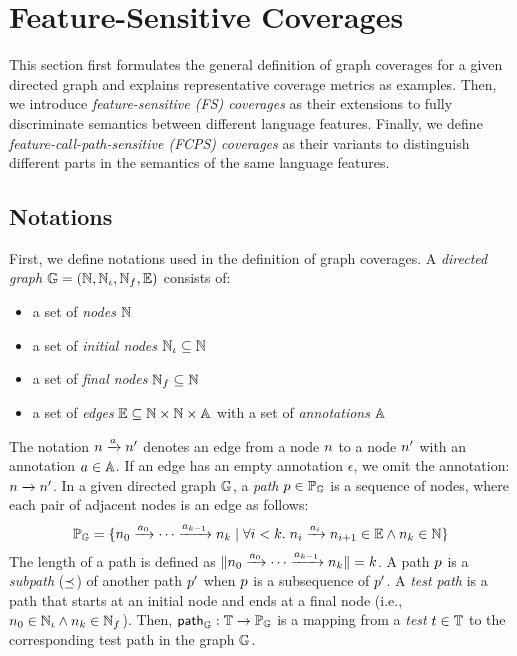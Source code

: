 \section{Feature-Sensitive Coverages}\label{sec:fscov}

This section first formulates the general definition of graph coverages for a
given directed graph and explains representative coverage metrics as examples.
%
Then, we introduce \textit{feature-sensitive (FS) coverages} as their
extensions to fully discriminate semantics between different language features.
%
Finally, we define \textit{feature-call-path-sensitive (FCPS) coverages} as
their variants to distinguish different parts in the semantics of the same
language features.




\subsection{Notations}
%
First, we define notations used in the definition of graph coverages.
%
A \textit{directed graph} $\mathbb{G} = (\mathbb{N}, \mathbb{N}_\iota,
\mathbb{N}_f, \mathbb{E})$ consists of:
\begin{itemize}
  \item a set of \textit{nodes} $\mathbb{N}$
  \item a set of \textit{initial nodes} $\mathbb{N}_\iota \subseteq \mathbb{N}$
  \item a set of \textit{final nodes} $\mathbb{N}_f \subseteq \mathbb{N}$
  \item a set of \textit{edges} $\mathbb{E} \subseteq \mathbb{N} \times \mathbb{N}
    \times \mathbb{A}$ with a set of \textit{annotations} $\mathbb{A}$
\end{itemize}
%
The notation $n \xrightarrow{a} n'$ denotes an edge from a node $n$ to
a node $n'$ with an annotation $a \in \mathbb{A}$.
%
If an edge has an empty annotation $\epsilon$, we omit the annotation: $n
\xrightarrow{} n'$.
%
In a given directed graph $\mathbb{G}$, a \textit{path} $p \in \mathbb{P}_{\mathbb{G}}$
is a sequence of nodes, where each pair of adjacent nodes is an edge as follows:
\[
  \mathbb{P}_{\mathbb{G}} = \{
    n_0 \xrightarrow{a_0} \cdots \xrightarrow{a_{k-1}} n_k \mid
    \forall i < k. \; n_i \xrightarrow{a_i} n_{i+1} \in \mathbb{E} \wedge
    n_k \in \mathbb{N}
  \}
\]
%
The length of a path is defined as $\lVert{n_0 \xrightarrow{a_0} \cdots
\xrightarrow{a_{k-1}} n_k}\rVert = k$.
%
A path $p$ is a \textit{subpath} ($\preceq$) of another path $p'$ when
$p$ is a subsequence of $p'$.
%
A \textit{test path} is a path that starts at an initial node and ends at a
final node (i.e., $n_0 \in \mathbb{N}_\iota \wedge n_k \in \mathbb{N}_f$).
%
Then, $\textsf{path}_{\mathbb{G}} : \mathbb{T} \rightarrow \mathbb{P}_{\mathbb{G}}$ is a mapping from
a \textit{test} $t \in \mathbb{T}$ to the corresponding test path in the graph
$\mathbb{G}$.

